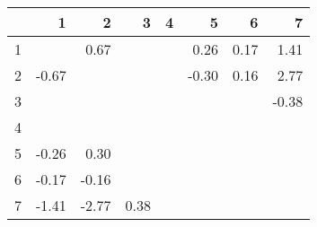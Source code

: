 \begin{table}[ht]
\centering
\begin{tabular}{rrrrrrrr}
  \hline
 & 1 & 2 & 3 & 4 & 5 & 6 & 7 \\ 
  \hline
1 &  & 0.67 &  &  & 0.26 & 0.17 & 1.41 \\ 
  2 & -0.67 &  &  &  & -0.30 & 0.16 & 2.77 \\ 
  3 &  &  &  &  &  &  & -0.38 \\ 
  4 &  &  &  &  &  &  &  \\ 
  5 & -0.26 & 0.30 &  &  &  &  &  \\ 
  6 & -0.17 & -0.16 &  &  &  &  &  \\ 
  7 & -1.41 & -2.77 & 0.38 &  &  &  &  \\ 
   \hline
\end{tabular}
\end{table}
